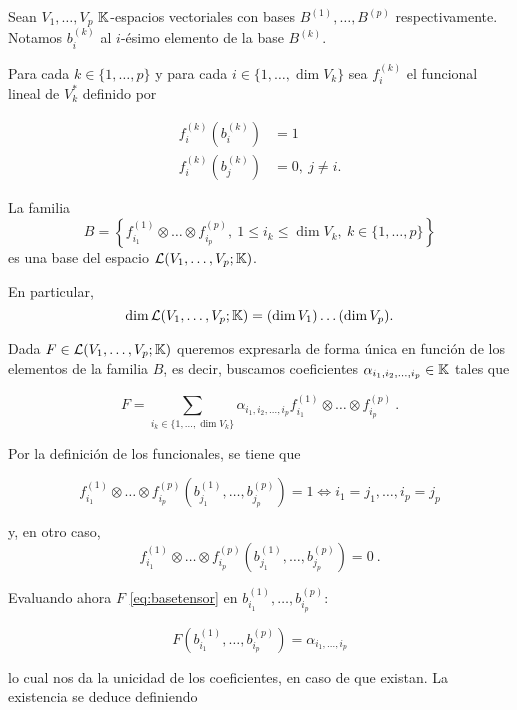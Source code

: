 \reme

\propb
\label{prop:base-funcionales} Sean \(V_1,\dots,V_p\) \(\mathbb{K}\)-espacios
vectoriales con bases \(B^{(1)},\dots,B^{(p)}\) respectivamente. Notamos
\(b_i^{(k)}\) al \(i\)-ésimo elemento de la base \(B^{(k)}\).

Para cada \(k\in\{1,\dots,p\}\) y para cada \(i\in\{1,\dots,\dim V_k\}\)
sea \(f_{i}^{(k)}\) el funcional lineal de \(V_k^{*}\) definido por

\begin{align*}
    f_{i}^{(k)}(b_i^{(k)})&=1\\
    f_{i}^{(k)}(b_j^{(k)})&=0,\ j\neq i.
\end{align*}

La familia
\[B=\left\{f_{i_1}^{(1)}\otimes\dots\otimes f_{i_p}^{(p)},\ 1\leq i_k\leq\dim{V_k},\ k\in\{1,\dots,p\}\right\}\]
es una base del espacio \(\mathcal{L}(V_1,\dots, V_p;\mathbb{K})\).

En particular,
\[\dim\mathcal{L}(V_1,\dots, V_p;\mathbb{K})=(\dim V_1)\dots (\dim V_p).\]

\proofb

Dada \(F\in \mathcal{L}(V_1,\dots, V_p;\mathbb{K})\) queremos expresarla de forma única
en función de los elementos de la familia \(B\), es decir, buscamos
coeficientes \(\alpha_{i_1,i_2,\dots,i_p}\in\mathbb{K}\) tales que

\begin{equation}
  \label{eq:basetensor}
  F=\sum\limits_{i_k\in\{1,\dots,\dim V_k\}} \alpha_{i_1,i_2,\dots,i_p}f_{i_1}^{(1)}\otimes\dots\otimes f_{i_p}^{(p)}\ .
\end{equation}

Por la definición de los funcionales, se tiene que

\begin{equation}
  \label{eq:evalbasetensor}
  f_{i_1}^{(1)}\otimes\dots\otimes f_{i_p}^{(p)}\left(b_{j_1}^{(1)},\dots,b_{j_p}^{(p)}\right)=1\Leftrightarrow i_1=j_1,\dots,i_p=j_p
\end{equation}

y, en otro caso,
\[f_{i_1}^{(1)}\otimes\dots\otimes f_{i_p}^{(p)}\left(b_{j_1}^{(1)},\dots,b_{j_p}^{(p)}\right)=0\ .\]

Evaluando ahora \(F\) \eqref{eq:basetensor} en
\(b_{i_1}^{(1)},\dots,b_{i_p}^{(p)}\):

\begin{equation*}
F\left(b_{i_1}^{(1)},\dots,b_{i_p}^{(p)}\right)=\alpha_{i_1,\dots,i_p}
\end{equation*}

lo cual nos da la unicidad de los coeficientes, en caso de que existan.
La existencia se deduce definiendo

